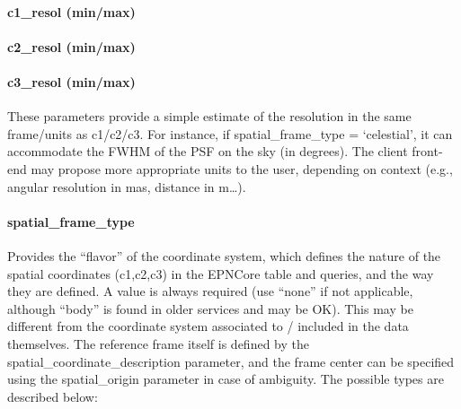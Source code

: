 \documentclass[11pt,a4paper]{ivoa}
\begin{document}
\paragraph{c1\_resol (min/max)}

\paragraph{c2\_resol (min/max)}

\paragraph{c3\_resol (min/max)}

These parameters provide a simple estimate of the resolution in the same
frame/units as c1/c2/c3. For instance, if spatial\_frame\_type =
`celestial', it can accommodate the FWHM of the PSF on the sky (in
degrees). The client front-end may propose more appropriate units to the
user, depending on context (e.g., angular resolution in mas, distance
in m\dots).

\paragraph{spatial\_frame\_type}

Provides the ``flavor'' of the coordinate system, which defines the nature
of the spatial coordinates (c1,c2,c3) in the EPNCore table and queries,
and the way they are defined. A value is always required (use ``none''
if not applicable, although ``body'' is found in older services and may
be OK). This may be different from the coordinate system associated to /
included in the data themselves. The reference frame itself is defined by
the spatial\_coordinate\_description parameter, and the frame center can
be specified using the spatial\_origin parameter in case of ambiguity.
The possible types are described below:
\end{document}
